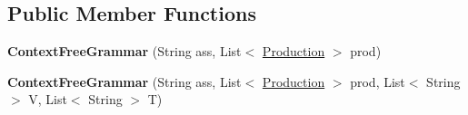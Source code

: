 \subsection*{Public Member Functions}
\begin{DoxyCompactItemize}
\item 
\hypertarget{classcontext_free_1_1grammar_1_1_context_free_grammar_ad4871f790005d3582e0f4d50aceac810}{{\bfseries Context\-Free\-Grammar} (String ass, List$<$ \hyperlink{classcontext_free_1_1grammar_1_1_production}{Production} $>$ prod)}\label{classcontext_free_1_1grammar_1_1_context_free_grammar_ad4871f790005d3582e0f4d50aceac810}

\item 
\hypertarget{classcontext_free_1_1grammar_1_1_context_free_grammar_aa29c85cc857ff390f50efc82d7c959e9}{{\bfseries Context\-Free\-Grammar} (String ass, List$<$ \hyperlink{classcontext_free_1_1grammar_1_1_production}{Production} $>$ prod, List$<$ String $>$ V, List$<$ String $>$ T)}\label{classcontext_free_1_1grammar_1_1_context_free_grammar_aa29c85cc857ff390f50efc82d7c959e9}


\end{DoxyCompactItemize}
